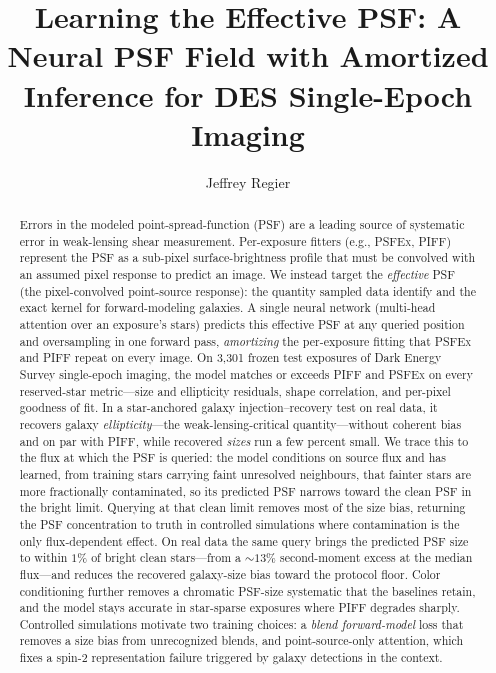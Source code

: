 \documentclass[twocolumn]{aastex701}
\begin{document}
\title{Learning the Effective PSF: A Neural PSF Field with Amortized
Inference for DES Single-Epoch Imaging}

\author{Jeffrey Regier}


\begin{abstract}
Errors in the modeled point-spread-function (PSF) are a leading source of systematic error
in weak-lensing shear measurement. Per-exposure fitters (e.g., \textsc{PSFEx}, \textsc{PIFF}) represent
the PSF as a sub-pixel surface-brightness profile that must be convolved with an assumed
pixel response to predict an image. We instead target the \emph{effective} PSF (the
pixel-convolved point-source response): the quantity sampled data identify and the exact
kernel for forward-modeling galaxies. A single neural network (multi-head
attention over an exposure's stars) predicts this effective PSF at any queried position
and oversampling in one forward pass, \emph{amortizing} the per-exposure fitting that
\textsc{PSFEx} and \textsc{PIFF} repeat on every image.
On 3{,}301 frozen test exposures of Dark Energy Survey single-epoch imaging, the model
matches or exceeds \textsc{PIFF} and \textsc{PSFEx} on every reserved-star metric---size
and ellipticity residuals, shape correlation, and per-pixel goodness of fit. In a
star-anchored galaxy injection--recovery test on real data, it recovers galaxy
\emph{ellipticity}---the weak-lensing-critical quantity---without coherent bias and on par
with \textsc{PIFF}, while recovered \emph{sizes} run a few percent small. We trace this to
the flux at which the PSF is queried: the model conditions on source flux and has learned,
from training stars carrying faint unresolved neighbours, that fainter stars are more
fractionally contaminated, so its predicted PSF narrows toward the clean PSF in the bright
limit. Querying at that clean limit removes most of the size bias, returning the PSF
concentration to truth in controlled simulations where contamination is the only
flux-dependent effect.
On real data the same query brings the predicted PSF size to within $1\%$ of bright clean
stars---from a ${\sim}13\%$ second-moment excess at the median flux---and reduces the
recovered galaxy-size bias toward the protocol floor.
Color conditioning further removes a chromatic PSF-size systematic
that the baselines retain, and the model stays accurate in star-sparse exposures where
\textsc{PIFF} degrades sharply. Controlled simulations motivate two training choices: a
\emph{blend forward-model} loss that removes a size bias from unrecognized blends, and
point-source-only attention, which fixes a spin-2 representation failure triggered by
galaxy detections in the context.
\end{abstract}
\end{document}
